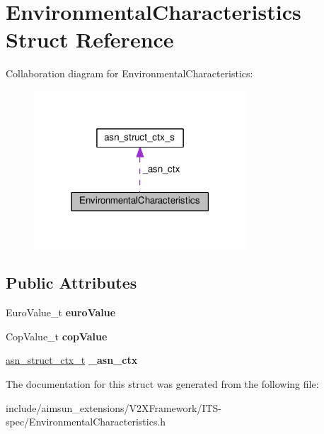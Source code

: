 \hypertarget{structEnvironmentalCharacteristics}{}\section{Environmental\+Characteristics Struct Reference}
\label{structEnvironmentalCharacteristics}


Collaboration diagram for Environmental\+Characteristics\+:\nopagebreak
\begin{figure}[H]
\begin{center}
\leavevmode
\includegraphics[width=225pt]{structEnvironmentalCharacteristics__coll__graph}
\end{center}
\end{figure}
\subsection*{Public Attributes}
\begin{DoxyCompactItemize}
\item 
Euro\+Value\+\_\+t {\bfseries euro\+Value}\hypertarget{structEnvironmentalCharacteristics_a8c15831e416b4591d37929e5fa1441ef}{}\label{structEnvironmentalCharacteristics_a8c15831e416b4591d37929e5fa1441ef}

\item 
Cop\+Value\+\_\+t {\bfseries cop\+Value}\hypertarget{structEnvironmentalCharacteristics_a5a609f6a8673195058b54c576b9eed07}{}\label{structEnvironmentalCharacteristics_a5a609f6a8673195058b54c576b9eed07}

\item 
\hyperlink{structasn__struct__ctx__s}{asn\+\_\+struct\+\_\+ctx\+\_\+t} {\bfseries \+\_\+asn\+\_\+ctx}\hypertarget{structEnvironmentalCharacteristics_aabda9ac86595e63d0be4c2c3e172a650}{}\label{structEnvironmentalCharacteristics_aabda9ac86595e63d0be4c2c3e172a650}

\end{DoxyCompactItemize}


The documentation for this struct was generated from the following file\+:\begin{DoxyCompactItemize}
\item 
include/aimsun\+\_\+extensions/\+V2\+X\+Framework/\+I\+T\+S-\/spec/Environmental\+Characteristics.\+h\end{DoxyCompactItemize}
